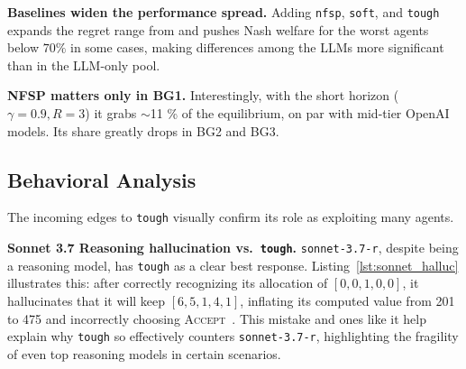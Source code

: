 \documentclass{article}
\theoremstyle{plain}
\theoremstyle{definition}
\theoremstyle{remark}
\newcommand{\ACCEPT}{\textsc{Accept}}
\begin{document}
\textbf{Baselines widen the performance spread.}
Adding \texttt{nfsp}, \texttt{soft}, and \texttt{tough} expands
the regret range from and pushes Nash welfare 
for the worst agents below \(70\%\) in some cases,
making differences among the LLMs more significant than in the LLM-only pool. 

\textbf{NFSP matters only in BG1.}
Interestingly, with the short horizon ($\gamma\!=\!0.9, R\!=\!3$) it grabs $\sim$11 \% of the equilibrium, on par with mid-tier OpenAI models.   
Its share greatly drops in BG2 and BG3.


\subsection{Behavioral Analysis}
\label{sec:llm-only-games-qual-findings}
The incoming edges
to \texttt{tough} visually
confirm its role as exploiting many agents. 

\textbf{Sonnet 3.7 Reasoning hallucination vs.\ \texttt{tough}.}
\texttt{sonnet-3.7-r}, despite being a reasoning model, has \texttt{tough} as a clear best response. Listing~\ref{lst:sonnet_halluc} illustrates this: after correctly recognizing its allocation of \([0,0,1,0,0]\), it hallucinates that it will keep \([6,5,1,4,1]\), inflating its computed value from 201 to 475 and incorrectly choosing \ACCEPT\ . This mistake and ones like it help explain why \texttt{tough} so effectively counters \texttt{sonnet-3.7-r}, highlighting the fragility of even top reasoning models in certain scenarios.
\end{document}
